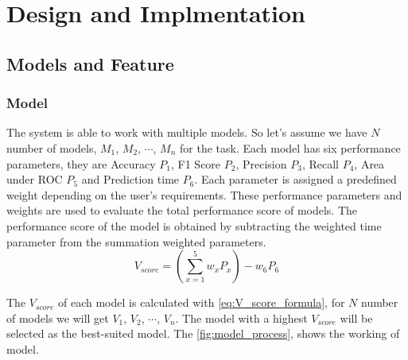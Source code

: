 \section{Design and Implmentation}\label{sec:design_and_implmentation}

\subsection{Models and Feature}\label{subsec:model_and_feature}

\subsubsection{Model}\label{subsubsec:model}

The system is able to work with multiple models. So let's assume we have $N$ number of models, $M_1$, $M_2$, $\cdots$, $M_n$ for the task. Each model has six performance parameters, they are Accuracy $P_1$, F1 Score $P_2$, Precision $P_3$, Recall $P_4$, Area under ROC $P_5$ and Prediction time $P_6$. Each parameter is assigned a predefined weight depending on the user's requirements. These performance parameters and weights are used to evaluate the total performance score of models. The performance score of the model is obtained by subtracting the weighted time parameter from the summation weighted parameters.
\begin{equation}\label{eq:V_score_formula}
    V_{score} = \left(\sum_{x=1}^5 w_xP_x\right) - w_6P_6
\end{equation}

The $V_{score}$ of each model is calculated with \autoref{eq:V_score_formula}, for $N$ number of models we will get $V_1$, $V_2$, $\cdots$, $V_n$. The model with a highest $V_{score}$ will be selected as the best-suited model. The \autoref{fig:model_process}, shows the working of model.

